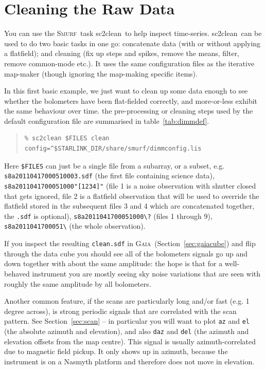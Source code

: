 \documentclass[twoside,11pt]{article}
\newcommand{\xref}[3]{#1}
\newcommand{\xlabel}[1]{}
\renewcommand{\_}{\texttt{\symbol{95}}}
\newenvironment{myquote}{\begin{quote}\begin{small}}{\end{small}\end{quote}}
\newcommand{\gaia}{\xref{\textsc{Gaia}}{sun214}{}}
\newcommand{\smurf}{\xref{\textsc{Smurf}}{sun258}{}}
\newcommand{\task}[1]{\textsf{#1}}
\newcommand{\clean}{\xref{\task{sc2clean}}{sun258}{SC2CLEAN}}
\begin{document}
\newpage
\appendix

\section{\xlabel{app_clean}Cleaning the Raw Data}
\label{app:clean}

You can use the \smurf\ task \clean\ to help inspect time-series.
\clean\ can be used to do two basic tasks in one go: concatenate data
(with or without applying a flatfield); and cleaning (fix up steps and
spikes, remove the means, filter, remove common-mode etc.). It uses
the same configuration files as the iterative map-maker (though
ignoring the map-making specific items).

In this first basic example, we just want to clean up some data enough
to see whether the bolometers have been flat-fielded correctly, and
more-or-less exhibit the same behaviour over time. the pre-processing
or cleaning steps used by the default configuration file are
summarised in table~\ref{tab:dimmdef}.

\begin{myquote}
\begin{verbatim}
% sc2clean $FILES clean config=^$STARLINK_DIR/share/smurf/dimmconfig.lis
\end{verbatim}
\end{myquote}

Here \texttt{\$FILES} can just be a single file from a subarray, or a
subset, e.g. \texttt{s8a20110417\_00051\_0003.sdf} (the first file
containing science data), \texttt{s8a20110417\_00051\_000"[1234]"}
(file 1 is a noise observation with shutter closed that gets ignored,
file 2 is a flatfield observation that will be used to override the
flatfield stored in the subsequent files 3 and 4 which are
concatenated together, the \texttt{.sdf} is optional),
\texttt{s8a20110417\_00051\_000\textbackslash?} (files 1 through 9),
\texttt{s8a20110417\_00051\_\textbackslash*} (the whole observation).

If you inspect the resulting \texttt{clean.sdf} in \gaia\
(Section~\ref{sec:gaiacube}) and flip through the data cube you should
see all of the bolometers signals go up and down together with about
the same amplitude: the hope is that for a well-behaved instrument you
are mostly seeing sky noise variations that are seen with roughly the
same amplitude by all bolometers.

Another common feature, if the scans are particularly long and/or fast
(e.g. 1\,degree across), is strong periodic signals that are correlated
with the scan pattern. See Section~\ref{sec:scan} -- in particular
you will want to plot \texttt{az} and \texttt{el} (the absolute
azimuth and elevation), and also \texttt{daz} and \texttt{del} (the
azimuth and elevation offsets from the map centre). This signal is
usually azimuth-correlated due to magnetic field pickup. It only shows
up in azimuth, because the instrument is on a Nasmyth platform and
therefore does not move in elevation.
\end{document}
